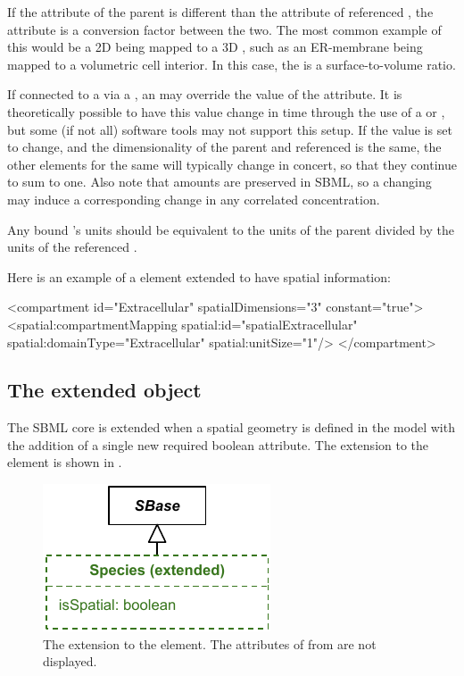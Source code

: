 If the  attribute of the parent \Compartment is different than the  attribute of referenced \DomainType, the  attribute is a conversion factor between the two.  The most common example of this would be a 2D \Compartment being mapped to a 3D \DomainType, such as an ER-membrane being mapped to a volumetric cell interior.  In this case, the  is a surface-to-volume ratio.

If connected to a \Parameter via a \SpatialSymbolReference, an \InitialAssignment may override the value of the  attribute.  It is theoretically possible to have this value change in time through the use of a \Rule or \Event, but some (if not all) software tools may not support this setup.  If the value is set to change, and the dimensionality of the parent \Compartment and referenced \DomainType is the same, the other \CompartmentMapping elements for the same \DomainType will typically change in concert, so that they continue to sum to one.  Also note that \Species amounts are preserved in SBML, so a changing  may induce a corresponding change in any correlated \Species concentration.

Any bound \Parameter's units should be equivalent to the units of the parent \Compartment divided by the units of the referenced \DomainType. 

Here is an example of a \Compartment element extended to have spatial information:

\begin{example}
  <compartment id="Extracellular" spatialDimensions="3" constant="true">
    <spatial:compartmentMapping spatial:id="spatialExtracellular"
        spatial:domainType="Extracellular" spatial:unitSize="1"/>
  </compartment>
\end{example}



\subsection{The extended \Species object}
\label{extended-species-class}
The SBML core \Species is extended when a spatial geometry is defined in the model with the addition of a single new required boolean  attribute.  The extension to the \Species element is shown in .
 
\begin{figure}[ht]
  \includegraphics{figs/extended-species-uml}
  \caption{The extension to the \Species element. The attributes of \Species from \sbmlthreecore are not displayed.}
  \label{species-uml}
\end{figure}



